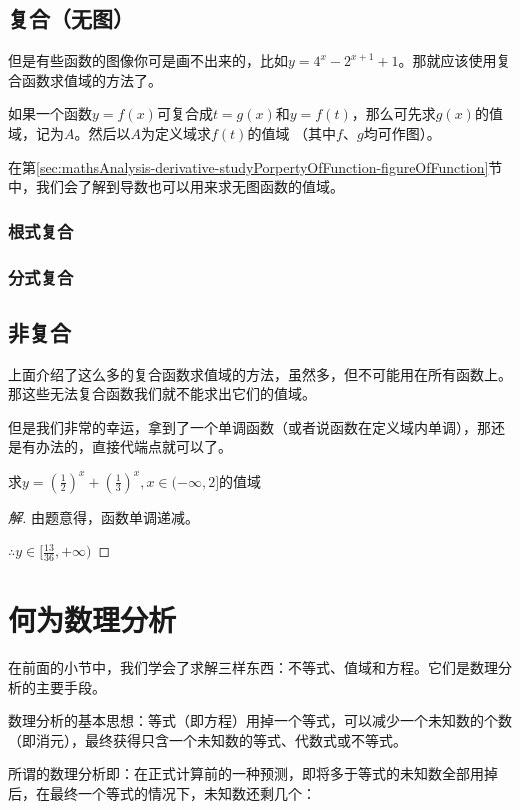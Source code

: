 \subsection[复合]{复合（无图）}
但是有些函数的图像你可是画不出来的，比如$y=4^x-2^{x+1}+1$。那就应该使用复合函数求值域的方法了。

如果一个函数$y=f(x)$可复合成$t=g(x)$和$y=f(t)$，那么可先求$g(x)$的值域，记为$A$。然后以$A$为定义域求$f(t)$的值域
（其中$f$、$g$均可作图）。

在第\ref{sec:mathsAnalysis-derivative-studyPorpertyOfFunction-figureOfFunction}节中，我们会了解到导数也可以用来求无图函数的值域。

\subsubsection{根式复合}
\subsubsection{分式复合}

\subsection{非复合}
上面介绍了这么多的复合函数求值域的方法，虽然多，但不可能用在所有函数上。那这些无法复合函数我们就不能求出它们的值域。

但是我们非常的幸运，拿到了一个单调函数（或者说函数在定义域内单调），那还是有办法的，直接代端点就可以了。

\begin{example}
	求$y=(\frac{1}{2})^x+(\frac{1}{3})^x,x\in(-\infty,2]$的值域
\end{example}
\begin{proof}[解]
	由题意得，函数单调递减。

	$\therefore y\in[\frac{13}{36},+\infty)$
\end{proof}

\section{何为数理分析}
在前面的小节中，我们学会了求解三样东西：不等式、值域和方程。它们是数理分析的主要手段。

数理分析的基本思想：等式（即方程）用掉一个等式，可以减少一个未知数的个数（即消元），最终获得只含一个未知数的等式、代数式或不等式。

所谓的数理分析即：在正式计算前的一种预测，即将多于等式的未知数全部用掉后，在最终一个等式的情况下，未知数还剩几个：

